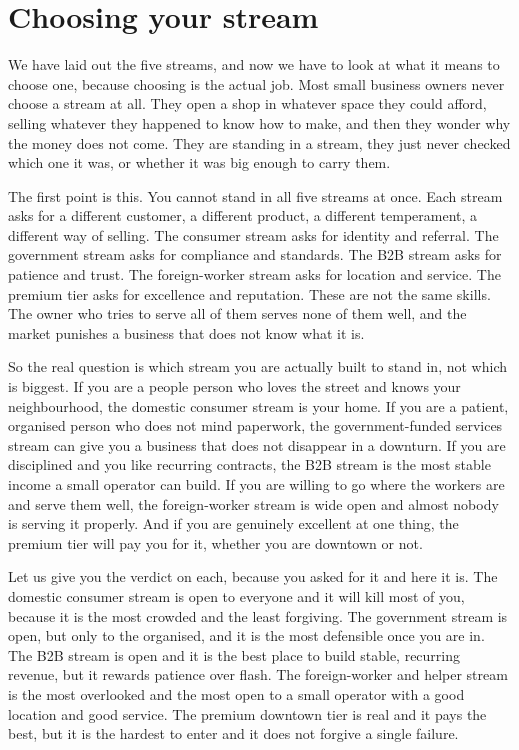 \documentclass[10pt,twoside,openany]{memoir}
\newcommand{\needspacehead}{\needspace{4\baselineskip}}
\let\oldsection\section
\renewcommand{\section}{\needspacehead\oldsection}
\begin{document}
{{{{{{{{{{{{{{\section{Choosing your stream}\label{choosing-your-stream}

We have laid out the five streams, and now we have to look at what it
means to choose one, because choosing is the actual job. Most small
business owners never choose a stream at all. They open a shop in
whatever space they could afford, selling whatever they happened to know
how to make, and then they wonder why the money does not come. They are
standing in a stream, they just never checked which one it was, or
whether it was big enough to carry them.

The first point is this. You cannot stand in all five streams at once.
Each stream asks for a different customer, a different product, a
different temperament, a different way of selling. The consumer stream
asks for identity and referral. The government stream asks for
compliance and standards. The B2B stream asks for patience and trust.
The foreign-worker stream asks for location and service. The premium
tier asks for excellence and reputation. These are not the same skills.
The owner who tries to serve all of them serves none of them well, and
the market punishes a business that does not know what it is.

So the real question is which stream you are actually built to stand in,
not which is biggest. If you are a people person who loves the street
and knows your neighbourhood, the domestic consumer stream is your home.
If you are a patient, organised person who does not mind paperwork, the
government-funded services stream can give you a business that does not
disappear in a downturn. If you are disciplined and you like recurring
contracts, the B2B stream is the most stable income a small operator can
build. If you are willing to go where the workers are and serve them
well, the foreign-worker stream is wide open and almost nobody is
serving it properly. And if you are genuinely excellent at one thing,
the premium tier will pay you for it, whether you are downtown or not.

Let us give you the verdict on each, because you asked for it and here
it is. The domestic consumer stream is open to everyone and it will kill
most of you, because it is the most crowded and the least forgiving. The
government stream is open, but only to the organised, and it is the most
defensible once you are in. The B2B stream is open and it is the best
place to build stable, recurring revenue, but it rewards patience over
flash. The foreign-worker and helper stream is the most overlooked and
the most open to a small operator with a good location and good service.
The premium downtown tier is real and it pays the best, but it is the
hardest to enter and it does not forgive a single failure.

}}}}}}}}}}}}}}
\end{document}
